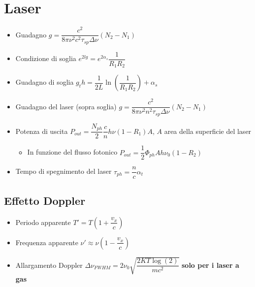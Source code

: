 \documentclass{article}
\begin{document}
\section{Laser}
\begin{itemize}
  \item Guadagno \( g = \dfrac{c^2}{8 \pi \nu^2 c^2 \tau_{sp} \Delta \nu} (N_2 - N_1) \)
  \item Condizione di soglia \( e ^ {2lg} = e^ {2 \alpha_s } \dfrac{1}{R_1 R_2} \)
  \item Guadagno di soglia \( g_th = \dfrac{1}{2L} \ln\left(\dfrac{1}{R_1 R_2}\right) + \alpha_s \)
  \item Guadagno del laser (sopra soglia) \( g = \dfrac{c^2}{8 \pi \nu^2 n ^ 2 \tau_{sp} \Delta \nu} (N_2 - N_1) \)
  \item Potenza di uscita \( P_{out} = \dfrac{N_{ph}}{2} \dfrac{c}{n} h \nu (1 - R_1) A \), \( A \) area della superficie del laser
        \begin{itemize}
          \item In funzione del flusso fotonico \( P_{out} = \dfrac{1}{2} \Phi_{ph} A h \nu_0 ( 1 - R_2) \)
        \end{itemize}
  \item Tempo di spegnimento del laser \( \tau_{ph} = \dfrac{n}{c} \alpha_t \)
\end{itemize}

\subsection{Effetto Doppler}
\begin{itemize}
  \item Periodo apparente \( T ' = T \left( 1 + \dfrac{v_x}{c} \right) \)
  \item Frequenza apparente \( \nu ' \approx \nu \left(1 - \dfrac{v_x}{c} \right) \)
  \item Allargamento Doppler \( \Delta \nu_{FWHM} = 2 \nu_0 \sqrt{\dfrac{2 K T \log(2)}{m c ^ 2}} \) \textbf{solo per i laser a gas}
\end{itemize}
\end{document}
